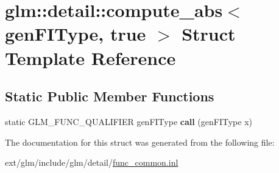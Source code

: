 \hypertarget{structglm_1_1detail_1_1compute__abs_3_01gen_f_i_type_00_01true_01_4}{\section{glm\-:\-:detail\-:\-:compute\-\_\-abs$<$ gen\-F\-I\-Type, true $>$ Struct Template Reference}
\label{structglm_1_1detail_1_1compute__abs_3_01gen_f_i_type_00_01true_01_4}
}
\subsection*{Static Public Member Functions}
\begin{DoxyCompactItemize}
\item 
\hypertarget{structglm_1_1detail_1_1compute__abs_3_01gen_f_i_type_00_01true_01_4_aa71d12c5d1f14e48f3be96bdf6b95861}{static G\-L\-M\-\_\-\-F\-U\-N\-C\-\_\-\-Q\-U\-A\-L\-I\-F\-I\-E\-R gen\-F\-I\-Type {\bfseries call} (gen\-F\-I\-Type x)}\label{structglm_1_1detail_1_1compute__abs_3_01gen_f_i_type_00_01true_01_4_aa71d12c5d1f14e48f3be96bdf6b95861}

\end{DoxyCompactItemize}


The documentation for this struct was generated from the following file\-:\begin{DoxyCompactItemize}
\item 
ext/glm/include/glm/detail/\hyperlink{func__common_8inl}{func\-\_\-common.\-inl}\end{DoxyCompactItemize}
